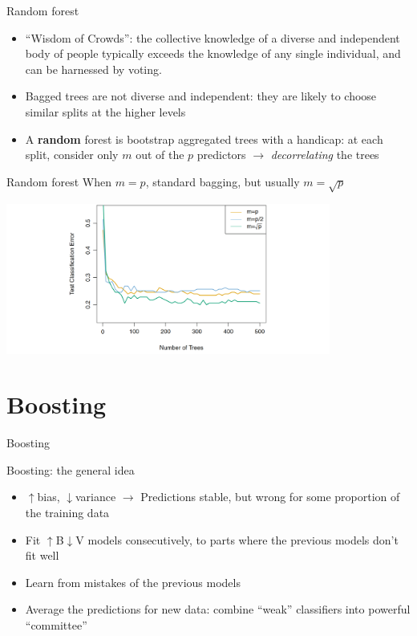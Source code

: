 \documentclass[xcolor=table,aspectratio=169]{beamer}
\newcommand{\referto}[1]{\hfill{\scriptsize{\emph{\color{gray}{#1}}}}}
\begin{document}
\begin{frame}{Random forest}
	\begin{itemize}
		\item ``Wisdom of Crowds'': the collective knowledge of a diverse and independent body of people typically exceeds the knowledge of any single individual, and can be harnessed by voting. \referto{Hastie and Tibshirani, p. 286}
		\item Bagged trees are not diverse and independent: they are likely to choose similar splits at the higher levels
		\item A \textbf{random} forest is bootstrap aggregated trees with a handicap: at each split, consider only $m$ out of the $p$ predictors $\to$ \textit{decorrelating} the trees
	\end{itemize}	
\end{frame}

\begin{frame}{Random forest}
When $m = p$, standard bagging, but usually $m = \sqrt{p}$

\includegraphics[width=0.8\textwidth]{pics/rf_mp.png}
\referto{ISLR, figure 8.10}
	
\end{frame}

\section{Boosting}
\begin{frame}
	Boosting
\end{frame}

\begin{frame}
	{Boosting: the general idea}
	
	\begin{itemize}
		\item $\uparrow$bias, $\downarrow$variance $\rightarrow$ Predictions stable, but wrong for some proportion of the training data
		\item[\textbf{IDEA}] Fit $\uparrow$B$\downarrow$V models consecutively, to parts where the previous models don't fit well
		\item Learn from mistakes of the previous models
		\item Average the predictions for new data: combine ``weak'' classifiers into powerful ``committee''
	\end{itemize}  
\end{frame}
\end{document}
